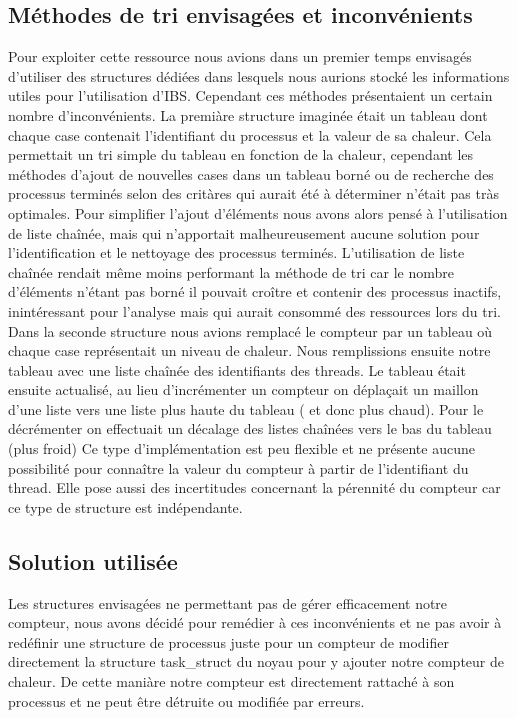 		\subsection{Méthodes de tri envisagées et inconvénients}
			Pour exploiter cette ressource nous avions dans un premier temps envisagés d'utiliser des structures dédiées dans lesquels nous aurions stocké les informations utiles pour l'utilisation d'IBS. Cependant ces méthodes présentaient un certain nombre d'inconvénients.
			La premiàre structure imaginée était un tableau dont chaque case contenait l'identifiant du processus et la valeur de sa chaleur. Cela permettait un tri simple du tableau en fonction de la chaleur, cependant les méthodes d'ajout de nouvelles cases dans un tableau borné ou de recherche des processus terminés selon des critàres qui aurait été à déterminer n'était pas tràs optimales.
			Pour simplifier l'ajout d'éléments nous avons alors pensé à l'utilisation de liste chaînée, mais qui n'apportait malheureusement aucune solution pour l'identification et le nettoyage des processus terminés. L'utilisation de liste chaînée rendait même moins performant la méthode de tri car le nombre d'éléments n'étant pas borné il pouvait croître et contenir des processus inactifs, inintéressant pour l'analyse mais qui aurait consommé des ressources lors du tri.
			Dans la seconde structure nous avions remplacé le compteur par un tableau où chaque case représentait un niveau de chaleur. Nous remplissions ensuite notre tableau avec une liste chaînée des identifiants des threads. Le tableau était ensuite actualisé, au lieu d'incrémenter un compteur on déplaçait un maillon d'une liste vers une liste plus haute du tableau ( et donc plus chaud). Pour le décrémenter on effectuait un décalage des listes chaînées vers le bas du tableau (plus froid)
			Ce type d'implémentation est peu flexible et ne présente aucune possibilité pour connaître la valeur du compteur à partir de l'identifiant du thread. Elle pose aussi des incertitudes concernant la pérennité du compteur car ce type de structure est indépendante.
		\subsection{Solution utilisée}
			Les structures envisagées ne permettant pas de gérer efficacement notre compteur, nous avons décidé pour remédier à ces inconvénients et ne pas avoir à redéfinir une structure de processus juste pour un compteur de modifier directement la structure task\_struct du noyau pour y ajouter notre compteur de chaleur. De cette maniàre notre compteur est directement rattaché à son processus et ne peut être détruite ou modifiée par erreurs.
